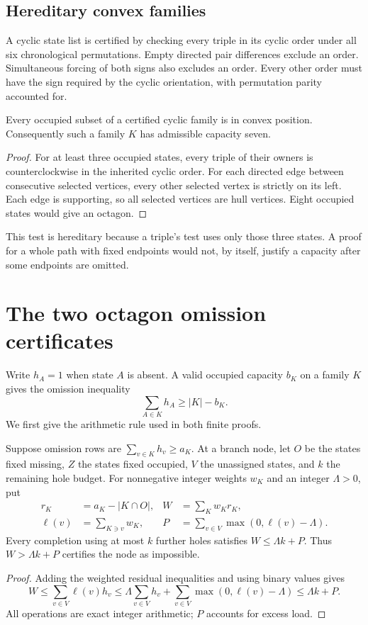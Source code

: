\subsection{Hereditary convex families}
A cyclic state list is certified by checking every triple in its cyclic
order under all six chronological permutations. Empty directed pair
differences exclude an order. Simultaneous forcing of both signs also
excludes an order. Every other order must have the sign required by the
cyclic orientation, with permutation parity accounted for.

\begin{lemma}\label{lem:cycle}
Every occupied subset of a certified cyclic family is in convex
position. Consequently such a family $K$ has admissible capacity seven.
\end{lemma}
\begin{proof}
For at least three occupied states, every triple of their owners is
counterclockwise in the inherited cyclic order. For each directed edge
between consecutive selected vertices, every other selected vertex is
strictly on its left. Each edge is supporting, so all selected vertices
are hull vertices. Eight occupied states would give an octagon.
\end{proof}

This test is hereditary because a triple's test uses only those three
states. A proof for a whole path with fixed endpoints would not, by
itself, justify a capacity after some endpoints are omitted.

\section{The two octagon omission certificates}\label{sec:319}
Write $h_A=1$ when state $A$ is absent. A valid occupied capacity $b_K$
on a family $K$ gives the omission inequality
\[
 \sum_{A\in K}h_A\ge |K|-b_K.
\]
We first give the arithmetic rule used in both finite proofs.

\begin{lemma}\label{lem:weighted}
Suppose omission rows are $\sum_{v\in K}h_v\ge a_K$. At a branch node,
let $O$ be the states fixed missing, $Z$ the states fixed occupied,
$V$ the unassigned states, and $k$ the remaining hole budget. For
nonnegative integer weights $w_K$ and an integer $\Lambda>0$, put
\begin{align*}
 r_K&=a_K-|K\cap O|,& W&=\sum_Kw_Kr_K,\\
 \ell(v)&=\sum_{K\ni v}w_K,&
 P&=\sum_{v\in V}\max(0,\ell(v)-\Lambda).
\end{align*}
Every completion using at most $k$ further holes satisfies $W\le \Lambda k+P$.
Thus $W>\Lambda k+P$ certifies the node as impossible.
\end{lemma}
\begin{proof}
Adding the weighted residual inequalities and using binary values gives
\[
 W\le\sum_{v\in V}\ell(v)h_v
 \le\Lambda\sum_{v\in V}h_v+\sum_{v\in V}\max(0,\ell(v)-\Lambda)
 \le \Lambda k+P.
\]
All operations are exact integer arithmetic; $P$ accounts for excess load.
\end{proof}

